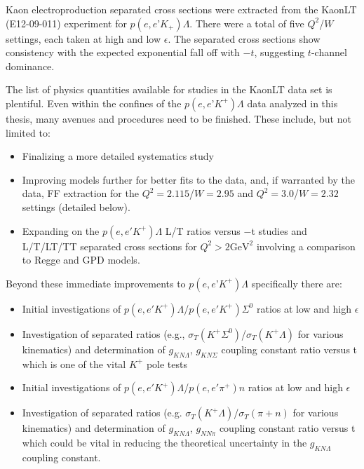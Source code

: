 \documentclass[
]{report}
\begin{document}
\FloatBarrier

\label{Chapter-6-5}







\FloatBarrier

\label{Chapter-7}

Kaon electroproduction separated cross sections were extracted from the
KaonLT (E12-09-011) experiment for \(p(e,e’K_+)\Lambda\). There were a
total of five \(Q^2\)/\(W\) settings, each taken at high and low
\(\epsilon\). The separated cross sections show consistency with the
expected exponential fall off with \(-t\), suggesting \(t\)-channel
dominance.

\label{Chapter-7-1}

The list of physics quantities available for studies in the KaonLT data
set is plentiful. Even within the confines of the \(p(e,e’K^+)\Lambda\)
data analyzed in this thesis, many avenues and procedures need to be
finished. These include, but not limited to:

\begin{itemize}
    \item   Finalizing a more detailed systematics study
    \item Improving models further for better fits to the data, and, if warranted by the data, FF extraction for the $Q^2=2.115$/$W=2.95$ and $Q^2=3.0$/$W=2.32$ settings (detailed below).
    \item Expanding on the $p(e, e′K^+)\Lambda$ L/T ratios versus −t studies and L/T/LT/TT separated cross sections for $Q^2 > 2 \mathrm{GeV}^2$ involving a comparison to Regge and GPD models.
\end{itemize}

Beyond these immediate improvements to \(p(e,e’K^+)\Lambda\)
specifically there are:

\begin{itemize}
    \item Initial investigations of $p(e, e′K^+)\Lambda$/$p(e, e′K^+)\Sigma^0$ ratios at low and high $\epsilon$ 
    \item Investigation of separated ratios (e.g., $\sigma_T(K^+\Sigma^0)$/$\sigma_T (K^+\Lambda)$ for various kinematics) and determination of $g_{KN\Lambda}$, $g_{KN\Sigma}$ coupling constant ratio versus t which is one of the vital $K^+$ pole tests
    \item Initial investigations of $p(e, e′K^+)\Lambda$/$p(e, e′\pi^+)n$ ratios at low and high $\epsilon$     
    \item Investigation of separated ratios (e.g. $\sigma_T(K^+\Lambda)$/$\sigma_T (\pi+n)$ for various kinematics) and determination of $g_{KN\Lambda}$, $g_{NN\pi}$ coupling constant ratio versus t which could be vital in reducing the theoretical uncertainty in the $g_{KN\Lambda}$ coupling constant.
\end{itemize}
\end{document}
